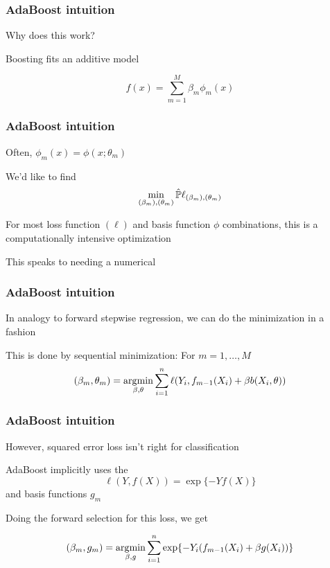 \documentclass[12pt]{beamer}
\begin{document}
\begin{frame}[fragile]
\frametitle{AdaBoost intuition}
 Why does this work?

\vsp
{} Boosting fits an additive model

\[
f(x) = \sum_{m=1}^M \beta_m \phi_m(x)
\]
\end{frame}

\begin{frame}[fragile]
\frametitle{AdaBoost intuition}
Often, $\phi_m(x) = \phi(x;\theta_m)$

\vsp

We'd like to find
\[
\min_{(\beta_m),(\theta_m)} \hat\P \ell_{(\beta_m),(\theta_m)}
\]

\vsp
For most loss function $(\ell)$ and basis function $\phi$ combinations, this is a computationally intensive
optimization

\vsp
This speaks to needing a numerical 
\end{frame}

\begin{frame}[fragile]
\frametitle{AdaBoost intuition}
In analogy to forward stepwise regression, we can do the minimization in a  fashion 


\vsp
This is done by sequential minimization: For $m =1 ,\ldots,M$
\[
(\beta_m,\theta_m) = \argmin_{\beta,\theta} \sum_{i=1}^n \ell(Y_i,f_{m-1}(X_i) + \beta b(X_i,\theta))
\]

\end{frame}

\begin{frame}[fragile]
\frametitle{AdaBoost intuition}
However, squared error loss isn't right for classification

\vsp
AdaBoost implicitly uses the 
\[
\ell(Y,f(X)) = \exp\{-Yf(X)\}
\]
and basis functions $g_m$

\vsp
Doing the forward selection for this loss, we get

\begin{align*}
(\beta_m,g_m) 
& = \argmin_{\beta,g} \sum_{i=1}^n \exp\{-Y_i(f_{m-1}(X_i) + \beta g(X_i))\}\\
\end{align*}

\end{frame}
\end{document}
